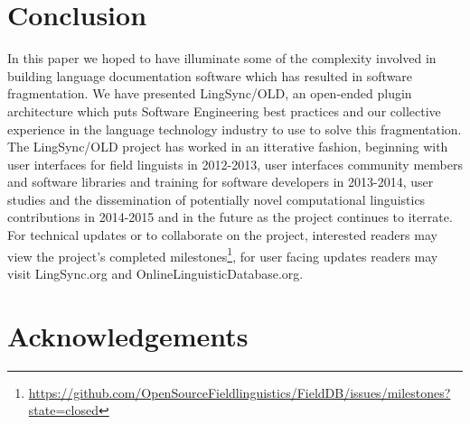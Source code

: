 \documentclass[11pt]{article}
\begin{document}
\section{Conclusion}


In this paper we hoped to have illuminate some of the complexity involved in building language documentation software which has resulted in software fragmentation. We have presented LingSync/OLD,  an open-ended plugin architecture which puts Software Engineering best practices and our collective experience in the language technology industry  to use to solve this fragmentation. The LingSync/OLD project has worked in an itterative fashion, beginning with user interfaces for field linguists in 2012-2013, user interfaces community members and software libraries and training for software developers in 2013-2014, user studies and the dissemination of  potentially novel computational linguistics contributions in 2014-2015 and in the future as the project continues to iterrate.  For technical updates or to collaborate on the project, interested readers may view the project's completed milestones\footnote{\url{https://github.com/OpenSourceFieldlinguistics/FieldDB/issues/milestones?state=closed} }, for user facing updates readers may visit  LingSync.org and OnlineLinguisticDatabase.org. 


\section*{Acknowledgements}
\end{document}
